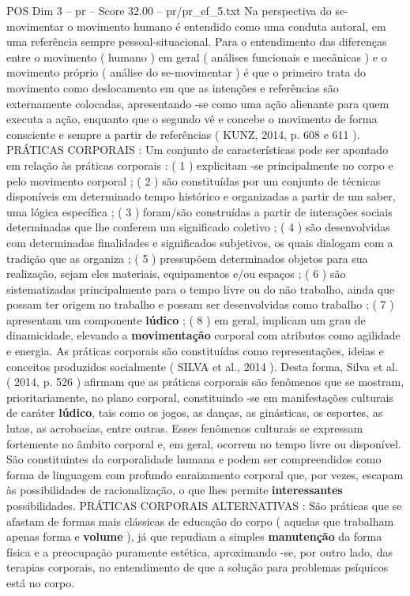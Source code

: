 \begin{textsample}{POS Dim 3 – pr – Score 32.00 – pr/pr\_ef\_5.txt}
Na perspectiva do se-movimentar o movimento humano é entendido como uma conduta autoral, em uma referência sempre pessoal-situacional.
Para o entendimento das diferenças entre o movimento ( humano ) em geral ( análises funcionais e mecânicas ) e o movimento próprio ( análise do se-movimentar ) é que o primeiro trata do movimento como deslocamento em que as intenções e referências são externamente colocadas, apresentando -se como uma ação alienante para quem executa a ação, enquanto que o segundo vê e concebe o movimento de forma consciente e sempre a partir de referências ( KUNZ, 2014, p. 608 e 611 ).
PRÁTICAS CORPORAIS : Um conjunto de características pode ser apontado em relação às práticas corporais : ( 1 ) explicitam -se principalmente no corpo e pelo movimento corporal ; ( 2 ) são constituídas por um conjunto de técnicas disponíveis em determinado tempo histórico e organizadas a partir de um saber, uma lógica específica ; ( 3 ) foram/são construídas a partir de interações sociais determinadas que lhe conferem um significado coletivo ; ( 4 ) são desenvolvidas com determinadas finalidades e significados subjetivos, os quais dialogam com a tradição que as organiza ; ( 5 ) pressupõem determinados objetos para sua realização, sejam eles materiais, equipamentos e/ou espaços ; ( 6 ) são sistematizadas principalmente para o tempo livre ou do não trabalho, ainda que possam ter origem no trabalho e possam ser desenvolvidas como trabalho ; ( 7 ) apresentam um componente \textbf{lúdico} ; ( 8 ) em geral, implicam um grau de dinamicidade, elevando a \textbf{movimentação} corporal com atributos como agilidade e energia.
As práticas corporais são constituídas como representações, ideias e conceitos produzidos socialmente ( SILVA et al., 2014 ).
Desta forma, Silva et al. ( 2014, p. 526 ) afirmam que as práticas corporais são fenômenos que se mostram, prioritariamente, no plano corporal, constituindo -se em manifestações culturais de caráter \textbf{lúdico}, tais como os jogos, as danças, as ginásticas, os esportes, as lutas, as acrobacias, entre outras.
Esses fenômenos culturais se expressam fortemente no âmbito corporal e, em geral, ocorrem no tempo livre ou disponível.
São constituintes da corporalidade humana e podem ser compreendidos como forma de linguagem com profundo enraizamento corporal que, por vezes, escapam às possibilidades de racionalização, o que lhes permite \textbf{interessantes} possibilidades.
PRÁTICAS CORPORAIS ALTERNATIVAS : São práticas que se afastam de formas mais clássicas de educação do corpo ( aquelas que trabalham apenas forma e \textbf{volume} ), já que repudiam a simples \textbf{manutenção} da forma física e a preocupação puramente estética, aproximando -se, por outro lado, das terapias corporais, no entendimento de que a solução para problemas psíquicos está no corpo.

\end{textsample}
